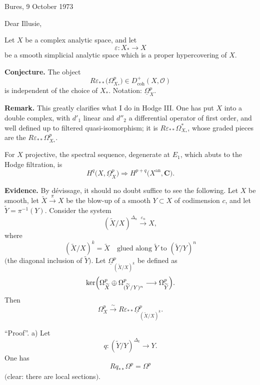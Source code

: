 \documentclass[11pt]{article}
\newcommand{\OO}{\mathcal O}
\newcommand{\CC}{\mathbf C}
\newcommand{\uOmega}{\underline{\Omega}}
\newcommand{\eps}{\varepsilon}
\newcommand{\coh}{\mathrm{coh}}
\begin{document}
\thispagestyle{empty}

\noindent\hfill Bures, 9 October 1973

\vspace{1.1em}

Dear Illusie,

Let \(X\) be a complex analytic space, and let
\[
\eps\colon X_\ast\longrightarrow X
\]
be a smooth simplicial analytic space which is a proper hypercovering of \(X\).

\textbf{Conjecture.} The object
\[
R\eps_{\ast\ast}\bigl(\Omega^p_{X_\ast}\bigr)\in D^+_{\coh}(X,\OO)
\]
is independent of the choice of \(X_\ast\). Notation: \(\uOmega^p_X\).

\textbf{Remark.} This greatly clarifies what I do in Hodge III. One has put \(X\) into a double complex, with \(d'_1\) linear and \(d''_2\) a differential operator of first order, and well defined up to filtered quasi-isomorphism; it is \(R\eps_{\ast\ast}\Omega^\ast_{X_\ast}\), whose graded pieces are the \(R\eps_{\ast\ast}\Omega^p_{X_\ast}\).

For \(X\) projective, the spectral sequence, degenerate at \(E_1\), which abuts to the Hodge filtration, is
\[
H^q\bigl(X,\uOmega^p_X\bigr)\Longrightarrow H^{p+q}\bigl(X^{\mathrm{an}},\CC\bigr).
\]

\textbf{Evidence.} By dévissage, it should no doubt suffice to see the following. Let \(X\) be smooth, let
\(\widetilde X\xrightarrow{\pi}X\) be the blow-up of a smooth \(Y\subset X\) of codimension \(c\), and let \(\widetilde Y=\pi^{-1}(Y)\). Consider the system
\[
(\widetilde X/X)^{\Delta_n}\xrightarrow{\eps_n}X,
\]
where
\[
(\widetilde X/X)^k=\widetilde X\quad\text{glued along }\widetilde Y
\text{ to }(\widetilde Y/Y)^n
\]
\(\bigl(\)the diagonal inclusion of \(\widetilde Y\)\(\bigr)\). Let
\(\uOmega^p_{(\widetilde X/X)^k}\) be defined as
\[
\ker\Bigl(\Omega^p_{\widetilde X}\oplus
\Omega^p_{(\widetilde Y/Y)^n}\longrightarrow \Omega^p_{\widetilde Y}\Bigr).
\]
Then
\[
\Omega^p_X\xrightarrow{\sim}
R\eps_{\ast\ast}\uOmega^p_{(\widetilde X/X)^k}.
\]

``Proof''. a) Let
\[
q\colon (\widetilde Y/Y)^{\Delta_k}\longrightarrow Y.
\]
One has
\[
Rq_{\ast\ast}\Omega^p=\Omega^p
\]
\(\bigl(\)clear: there are local sections\(\bigr)\).
\end{document}
